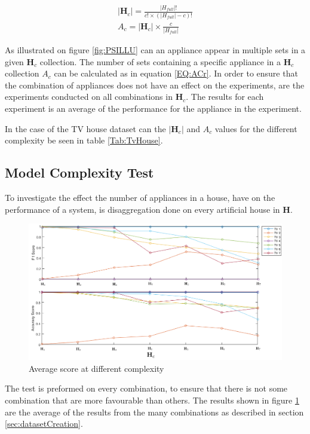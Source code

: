 \begin{gather}
		|\textbf{H}_c| = \frac{|H_{full}|!}{c! \times (|H_{full}| - c)!} \label{EQ:nCr} \\
		A_c = |\textbf{H}_c| \times \frac{c}{|H_{full}|} \label{EQ:ACr}
\end{gather}


As illustrated on figure \ref{fig:PSILLU} can an appliance appear in multiple sets in a given $\textbf{H}_c$ collection. The number of sets containing a specific appliance in a $\textbf{H}_c$ collection $A_c$ can be calculated as in equation \ref{EQ:ACr}. In order to ensure that the combination of appliances does not have an effect on the experiments, are the experiments conducted on all combinations in $\textbf{H}_c$. The results for each experiment is an average of the performance for the appliance in the experiment. 



In the case of the TV house dataset can the $|\textbf{H}_c|$ and $A_c$ values for the different complexity be seen in table \ref{Tab:TvHouse}.


\subsection{Model Complexity Test}
\label{sec:MCT}
To investigate the effect the number of appliances in a house, have on the performance of a  system, is disaggregation done on every artificial house in $\textbf{H}$.

\begin{figure}[H]
\centering
\includegraphics[width=1\textwidth]{billeder/ModelSize.png}
\caption{Average score at different complexity }
\label{fig:COMPT}
\end{figure}

The test is preformed on every combination, to ensure that there is not some combination that are more favourable than others. The results shown in figure \ref{fig:COMPT} are the average of the results from the many combinations as described in section \ref{sec:datasetCreation}. 


